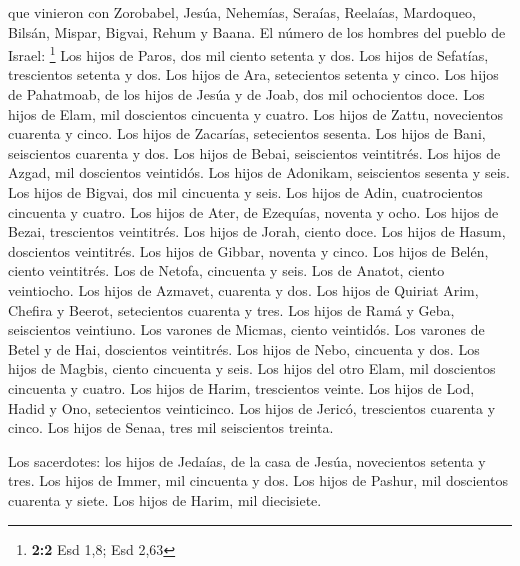 que vinieron con Zorobabel, Jesúa, Nehemías, Seraías,
Reelaías, Mardoqueo, Bilsán, Mispar, Bigvai, Rehum y Baana. El número de
los hombres del pueblo de Israel: \footnote{\textbf{2:2} Esd 1,8; Esd
  2,63}  Los hijos de Paros, dos mil ciento setenta y dos.
 Los hijos de Sefatías, trescientos setenta y dos.
 Los hijos de Ara, setecientos setenta y cinco.
 Los hijos de Pahatmoab, de los hijos de Jesúa y de Joab,
dos mil ochocientos doce.  Los hijos de Elam, mil
doscientos cincuenta y cuatro.  Los hijos de Zattu,
novecientos cuarenta y cinco.  Los hijos de Zacarías,
setecientos sesenta.  Los hijos de Bani, seiscientos
cuarenta y dos.  Los hijos de Bebai, seiscientos
veintitrés.  Los hijos de Azgad, mil doscientos
veintidós.  Los hijos de Adonikam, seiscientos sesenta y
seis.  Los hijos de Bigvai, dos mil cincuenta y seis.
 Los hijos de Adin, cuatrocientos cincuenta y cuatro.
 Los hijos de Ater, de Ezequías, noventa y ocho.
 Los hijos de Bezai, trescientos veintitrés.
 Los hijos de Jorah, ciento doce.  Los
hijos de Hasum, doscientos veintitrés.  Los hijos de
Gibbar, noventa y cinco.  Los hijos de Belén, ciento
veintitrés.  Los de Netofa, cincuenta y seis.
 Los de Anatot, ciento veintiocho.  Los
hijos de Azmavet, cuarenta y dos.  Los hijos de Quiriat
Arim, Chefira y Beerot, setecientos cuarenta y tres.  Los
hijos de Ramá y Geba, seiscientos veintiuno.  Los varones
de Micmas, ciento veintidós.  Los varones de Betel y de
Hai, doscientos veintitrés.  Los hijos de Nebo, cincuenta
y dos.  Los hijos de Magbis, ciento cincuenta y seis.
 Los hijos del otro Elam, mil doscientos cincuenta y
cuatro.  Los hijos de Harim, trescientos veinte.
 Los hijos de Lod, Hadid y Ono, setecientos veinticinco.
 Los hijos de Jericó, trescientos cuarenta y cinco.
 Los hijos de Senaa, tres mil seiscientos treinta.

 Los sacerdotes: los hijos de Jedaías, de la casa de
Jesúa, novecientos setenta y tres.  Los hijos de Immer,
mil cincuenta y dos.  Los hijos de Pashur, mil doscientos
cuarenta y siete.  Los hijos de Harim, mil diecisiete.

